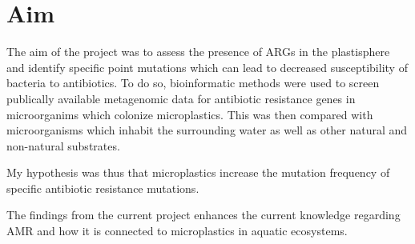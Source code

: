 




\section{Aim} %
The aim of the project was to assess the presence of ARGs in the plastisphere and identify specific point mutations which can lead to decreased susceptibility of bacteria to antibiotics.
To do so, bioinformatic methods were used to screen publically available metagenomic data for antibiotic resistance genes in microorganims which colonize microplastics. This was then compared with microorganisms which inhabit the surrounding water as well as other natural and non-natural substrates.

My hypothesis was thus that microplastics increase the mutation frequency of specific antibiotic resistance mutations.

The findings from the current project enhances the current knowledge regarding AMR and how it is connected to microplastics in aquatic ecosystems.




